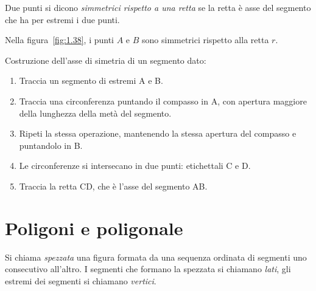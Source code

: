 \begin{definizione}
Due punti si dicono \emph{simmetrici rispetto a una retta} se la 
retta è asse del segmento che ha per estremi i due punti.
\end{definizione}

Nella figura~\ref{fig:1.38}, i punti $A$ e $B$ sono simmetrici 
rispetto alla retta $r$.

\begin{procedura}
	Costruzione dell'asse di simetria di un segmento dato:
	\begin{enumerate} [nosep]
		\item 
		Traccia un segmento di estremi A e B.
		\item 
		Traccia una circonferenza puntando il compasso in A, con apertura maggiore della lunghezza della metà del segmento.  
		\item 
		 Ripeti la stessa operazione, mantenendo la stessa apertura del compasso e puntandolo in B.
		\item 
		Le circonferenze si intersecano in due punti: etichettali C e D.
		\item 
		Traccia la retta CD, che è l'asse del segmento AB.
	\end{enumerate}
\end{procedura}

\vspazio\ovalbox{\risolvii \ref{ese:1.66}, \ref{ese:1.67}, 
\ref{ese:1.68}, \ref{ese:1.69}, \ref{ese:1.70}, \ref{ese:1.71}, 
\ref{ese:1.72}, \ref{ese:1.73}, \ref{ese:1.74}, \ref{ese:1.75}, 
\ref{ese:1.76}, \ref{ese:1.77}, \ref{ese:1.78},}

\ovalbox{\ref{ese:1.79}, \ref{ese:1.80}, \ref{ese:1.81}, 
\ref{ese:1.82}, \ref{ese:1.83}, \ref{ese:1.84}, \ref{ese:1.85}, 
\ref{ese:1.86}, \ref{ese:1.87}, \ref{ese:1.88}, \ref{ese:1.89}, 
\ref{ese:1.90}, \ref{ese:1.91}, \ref{ese:1.92},\ref{ese:1.93}, 
\ref{ese:1.94}, \ref{ese:1.95},}

\ovalbox{\ref{ese:1.96}, \ref{ese:1.97}, \ref{ese:1.98}, 
\ref{ese:1.99}, \ref{ese:1.100}, \ref{ese:1.101}, \ref{ese:1.102}, 
\ref{ese:1.103}}




\section{Poligoni e poligonale}\label{sect:poligoni}

\begin{definizione}
Si chiama \emph{spezzata} una figura formata da una sequenza ordinata 
di segmenti uno consecutivo all'altro. I segmenti che formano la 
spezzata si chiamano \emph{lati}, gli estremi dei segmenti si 
chiamano \emph{vertici}.
\end{definizione}

